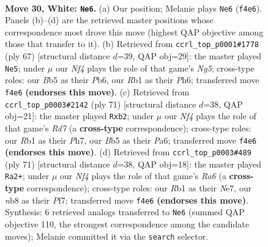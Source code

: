 \documentclass[11pt]{article}
\begin{document}
\clearpage

\begin{figure}[p]\centering
\begin{subfigure}{0.46\textwidth}\centering
\resizebox{\linewidth}{!}{%
\newchessgame
\chessboard[
  setfen={rnr5/8/7k/1B3p1p/3p1N2/pP4P1/P4K2/1R6 w - - 2 30},
  showmover=false,
  pgfstyle=straightmove, color=movearrow, markmove={f4-e6}
]}
\caption{}
\end{subfigure}\hfill
\begin{subfigure}{0.46\textwidth}\centering
\resizebox{\linewidth}{!}{%
\newchessgame
\chessboard[
  setfen={6k1/p5p1/1p5p/8/1PP3n1/P4R2/3KN1PP/r7 b - - 4 34},
  showmover=false,
  pgfstyle=straightmove, color=movearrow, markmove={g4-e5}
]}
\caption{}
\end{subfigure}
\\[4pt]
\begin{subfigure}{0.46\textwidth}\centering
\resizebox{\linewidth}{!}{%
\newchessgame
\chessboard[
  setfen={6k1/1p4pp/p1n5/2p5/5P2/1PN1R1PP/1P1r4/5K2 b - - 5 36},
  showmover=false,
  pgfstyle=straightmove, color=movearrow, markmove={d2-b2}
]}
\caption{}
\end{subfigure}\hfill
\begin{subfigure}{0.46\textwidth}\centering
\resizebox{\linewidth}{!}{%
\newchessgame
\chessboard[
  setfen={8/1p2npk1/4b3/pP5B/P2R1P2/r3N3/5K1P/8 b - - 2 36},
  showmover=false,
  pgfstyle=straightmove, color=movearrow, markmove={a3-a2}
]}
\caption{}
\end{subfigure}
\caption{\textbf{Move 30, White: \texttt{Ne6}.} (a) Our position; Melanie plays \texttt{Ne6} (\texttt{f4e6}). Panels (b)--(d) are the retrieved master positions whose correspondence most drove this move (highest QAP objective among those that transfer to it). (b) Retrieved from \texttt{ccrl\_top\_p0001\#1778} (ply 67) [structural distance $d$=39, QAP obj=29]: the master played \texttt{Ne5}; under $\mu$ our \emph{Nf4} plays the role of that game's \emph{Ng5}; cross-type roles: our \emph{B}b5 as their \emph{P}b6, our \emph{R}b1 as their \emph{P}h6; transferred move \texttt{f4e6} \textbf{(endorses this move)}. (c) Retrieved from \texttt{ccrl\_top\_p0003\#2142} (ply 71) [structural distance $d$=38, QAP obj=21]: the master played \texttt{Rxb2}; under $\mu$ our \emph{Nf4} plays the role of that game's \emph{Rd7} (a \textbf{cross-type} correspondence); cross-type roles: our \emph{R}b1 as their \emph{P}h7, our \emph{B}b5 as their \emph{P}a6; transferred move \texttt{f4e6} \textbf{(endorses this move)}. (d) Retrieved from \texttt{ccrl\_top\_p0003\#489} (ply 71) [structural distance $d$=38, QAP obj=18]: the master played \texttt{Ra2+}; under $\mu$ our \emph{Nf4} plays the role of that game's \emph{Ra6} (a \textbf{cross-type} correspondence); cross-type roles: our \emph{R}b1 as their \emph{N}e7, our \emph{n}b8 as their \emph{P}f7; transferred move \texttt{f4e6} \textbf{(endorses this move)}. Synthesis: 6 retrieved analogs transferred to \texttt{Ne6} (summed QAP objective 110, the strongest correspondence among the candidate moves); Melanie committed it via the \texttt{search} selector.}
\label{fig:thought-m58}
\end{figure}
\end{document}
